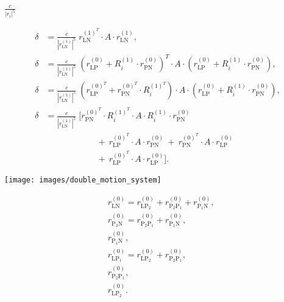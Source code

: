 \documentclass[a4paper,11pt,twoside,openright]{book}
\def\lthtmlcheckvsize{\ifdim\ht\sizebox<\vsize 
  \ifdim\wd\sizebox<\hsize\expandafter\hfill\fi \expandafter\vfill
  \else\expandafter\vss\fi}%
\begin{document}
{\newpage\clearpage
{}%
$\displaystyle {\frac{{c}}{{\left| r_i \right|^5}}}$%
\lthtmlindisplaymathZ
\lthtmlcheckvsize\clearpage}

{\newpage\clearpage
\setcounter{equation}{59}
%
\begin{subequations}\begin{align}
\delta &= \frac{c}{\left| r_{\textrm{LN}}^{(1)} \right|^5} \;
r_{\textrm{LN}}^{(1)^T} \cdot A \cdot r_{\textrm{LN}}^{(1)} , \\
\delta &= \frac{c}{\left| r_{\textrm{LN}}^{(1)} \right|^5} \;
\left( r_{\textrm{LP}}^{(0)} + R_i^{(1)} \cdot r_{\textrm{PN}}^{(0)} \right)^T
\cdot A \cdot
\left( r_{\textrm{LP}}^{(0)} + R_i^{(1)} \cdot r_{\textrm{PN}}^{(0)} \right) , \\
\delta &= \frac{c}{\left| r_{\textrm{LN}}^{(1)} \right|^5} \;
\left( r_{\textrm{LP}}^{(0)^T} + r_{\textrm{PN}}^{(0)^T} \cdot R_i^{(1)^T} \right)
\cdot A \cdot
\left( r_{\textrm{LP}}^{(0)} + R_i^{(1)} \cdot r_{\textrm{PN}}^{(0)} \right) , \\
\delta &= \frac{c}{\left| r_{\textrm{LN}}^{(1)} \right|^5} \; \Bigg[
r_{\textrm{PN}}^{(0)^T} \cdot R_i^{(1)^T} \cdot A \cdot R_i^{(1)} \cdot r_{\textrm{PN}}^{(0)}  \\
& \qquad\qquad\qquad  + \  r_{\textrm{LP}}^{(0)^T} \cdot A \cdot r_{\textrm{PN}}^{(0)}
\  + \  r_{\textrm{PN}}^{(0)^T} \cdot A \cdot r_{\textrm{LP}}^{(0)} \nonumber \\
& \qquad\qquad\qquad  + \  r_{\textrm{LP}}^{(0)^T} \cdot A \cdot r_{\textrm{LP}}^{(0)} \Bigg] .
\end{align}\end{subequations}%
\lthtmldisplayZ
\lthtmlcheckvsize\clearpage}

{\newpage\clearpage
{}%
\texttt{[image: images/double\_motion\_system]}%
\lthtmlpictureZ
\lthtmlcheckvsize\clearpage}

{\newpage\clearpage
\setcounter{equation}{60}
%
\begin{subequations}\begin{align}
& r_{\textrm{LN}}^{(0)} = r_{\textrm{LP}_2}^{(0)} + r_{\textrm{P}_2 \textrm{P}_1}^{(0)} + r_{\textrm{P}_1 \textrm{N}}^{(0)}, \\
& r_{\textrm{P}_2 \textrm{N}}^{(0)} = r_{\textrm{P}_2 \textrm{P}_1}^{(0)} + r_{\textrm{P}_1 \textrm{N}}^{(0)} , \\
& r_{\textrm{P}_1 \textrm{N}}^{(0)}, \\
& r_{\textrm{LP}_1}^{(0)} = r_{\textrm{LP}_2}^{(0)} + r_{\textrm{P}_2 \textrm{P}_1}^{(0)} , \\
& r_{\textrm{P}_2 \textrm{P}_1}^{(0)}, \\
& r_{\textrm{LP}_2}^{(0)} .
\end{align}\end{subequations}%
\lthtmldisplayZ
\lthtmlcheckvsize\clearpage}
\end{document}
